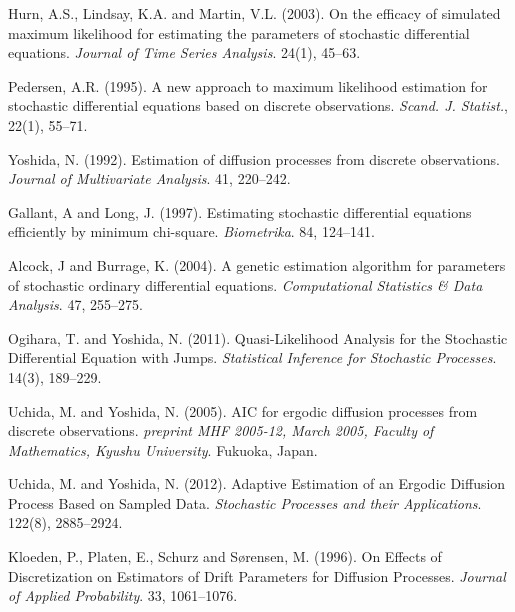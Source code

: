 \begin{thebibliography}{1}
Hurn, A.S., Lindsay, K.A. and Martin, V.L. (2003).
\newblock On the efficacy of simulated maximum likelihood for estimating the parameters of stochastic differential equations.
\newblock \emph{Journal of Time Series Analysis}. 24(1), 45--63.

Pedersen, A.R. (1995).
\newblock A new approach to maximum likelihood estimation for stochastic differential equations based on discrete observations.
\newblock \emph{Scand. J. Statist.}, 22(1), 55--71.

Yoshida, N. (1992).
\newblock Estimation of diffusion processes from discrete observations.
\newblock \emph{Journal of Multivariate Analysis}. 41, 220--242.

Gallant, A and Long, J. (1997).
\newblock Estimating stochastic differential equations efficiently by minimum chi-square.
\newblock \emph{Biometrika}. 84, 124--141.

Alcock, J and Burrage, K. (2004).
\newblock A genetic estimation algorithm for parameters of stochastic ordinary differential equations.
\newblock \emph{Computational Statistics \& Data Analysis}. 47, 255--275.

Ogihara, T. and Yoshida, N. (2011).
\newblock  Quasi-Likelihood Analysis for the Stochastic Differential Equation with Jumps.
\newblock \emph{Statistical Inference for Stochastic Processes}. 14(3), 189--229.

Uchida, M. and Yoshida, N. (2005).
\newblock AIC for ergodic diffusion processes from discrete observations.
\newblock \emph{preprint MHF 2005-12, March 2005, Faculty of Mathematics, Kyushu University}. Fukuoka, Japan.

Uchida, M. and Yoshida, N. (2012).
\newblock Adaptive Estimation of an Ergodic Diffusion Process Based on Sampled Data.
\newblock \emph{Stochastic Processes and their Applications}. 122(8), 2885--2924.

Kloeden, P., Platen, E., Schurz and S{\o}rensen, M. (1996).
\newblock On Effects of Discretization on Estimators of Drift Parameters for Diffusion Processes.
\newblock \emph{Journal of Applied Probability}. 33, 1061--1076.

\end{thebibliography}


